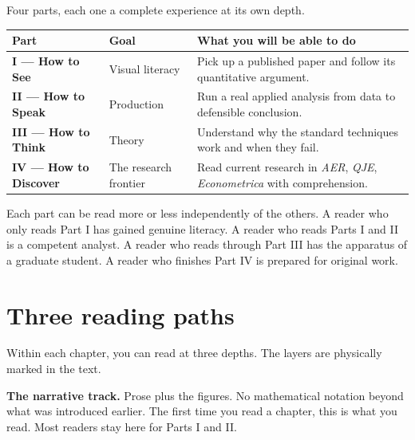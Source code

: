 \documentclass[
  letterpaper,
  11pt,
  twoside,
  openany]{scrbook}
\newcounter{none} %
\begin{document}
Four parts, each one a complete experience at its own depth.

{\def\LTcaptype{none} %
\begin{longtable}[]{@{}
  >{\raggedright\arraybackslash}p{}
  >{\raggedright\arraybackslash}p{}
  >{\raggedright\arraybackslash}p{}@{}}
\toprule\noalign{}
\begin{minipage}[b]{\linewidth}\raggedright
Part
\end{minipage} & \begin{minipage}[b]{\linewidth}\raggedright
Goal
\end{minipage} & \begin{minipage}[b]{\linewidth}\raggedright
What you will be able to do
\end{minipage} \\
\midrule\noalign{}
\endhead
\bottomrule\noalign{}
\endlastfoot
\textbf{I --- How to See} & Visual literacy & Pick up a published paper
and follow its quantitative argument. \\
\textbf{II --- How to Speak} & Production & Run a real applied analysis
from data to defensible conclusion. \\
\textbf{III --- How to Think} & Theory & Understand why the standard
techniques work and when they fail. \\
\textbf{IV --- How to Discover} & The research frontier & Read current
research in \emph{AER}, \emph{QJE}, \emph{Econometrica} with
comprehension. \\
\end{longtable}
}

Each part can be read more or less independently of the others. A reader
who only reads Part I has gained genuine literacy. A reader who reads
Parts I and II is a competent analyst. A reader who reads through Part
III has the apparatus of a graduate student. A reader who finishes Part
IV is prepared for original work.

\section{Three reading paths}\label{three-reading-paths-1}

Within each chapter, you can read at three depths. The layers are
physically marked in the text.

\textbf{The narrative track.} Prose plus the figures. No mathematical
notation beyond what was introduced earlier. The first time you read a
chapter, this is what you read. Most readers stay here for Parts I and
II.
\end{document}
